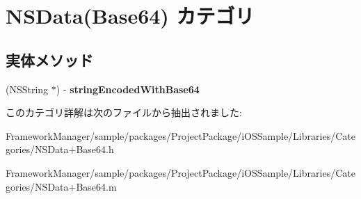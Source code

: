 \hypertarget{category_n_s_data_07_base64_08}{}\section{N\+S\+Data(Base64) カテゴリ}
\label{category_n_s_data_07_base64_08}
\subsection*{実体メソッド}
\begin{DoxyCompactItemize}
\item 
\hypertarget{category_n_s_data_07_base64_08_a471d4abc1e4ef605ce02d19fdf2cea92}{}(N\+S\+String $\ast$) -\/ {\bfseries string\+Encoded\+With\+Base64}\label{category_n_s_data_07_base64_08_a471d4abc1e4ef605ce02d19fdf2cea92}

\end{DoxyCompactItemize}


このカテゴリ詳解は次のファイルから抽出されました\+:\begin{DoxyCompactItemize}
\item 
Framework\+Manager/sample/packages/\+Project\+Package/i\+O\+S\+Sample/\+Libraries/\+Categories/N\+S\+Data+\+Base64.\+h\item 
Framework\+Manager/sample/packages/\+Project\+Package/i\+O\+S\+Sample/\+Libraries/\+Categories/N\+S\+Data+\+Base64.\+m\end{DoxyCompactItemize}
